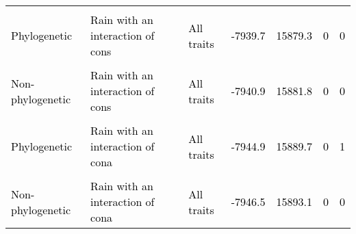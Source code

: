 \documentclass[
  12pt,
  letterpaper,
  DIV=11,
  numbers=noendperiod]{scrartcl}
\begin{document}
\begin{table}[H]
{\begin{tabular}[t]{lllllll}
\cellcolor{gray!6}{\textcolor{black}{Non-phylogenetic}} & \cellcolor{gray!6}{\textcolor{black}{No rain}} & \cellcolor{gray!6}{\textcolor{black}{All traits}} & \cellcolor{gray!6}{\textcolor{black}{-7939.2}} & \cellcolor{gray!6}{\textcolor{black}{15878.5}} & \cellcolor{gray!6}{\textcolor{black}{0}} & \cellcolor{gray!6}{\textcolor{black}{0}}\\
\addlinespace
\textcolor{black}{Phylogenetic} & \textcolor{black}{Rain with an interaction of cons} & \textcolor{black}{All traits} & \textcolor{black}{-7939.7} & \textcolor{black}{15879.3} & \textcolor{black}{0} & \textcolor{black}{0}\\
\cellcolor{gray!6}{\textcolor{black}{Non-phylogenetic}} & \cellcolor{gray!6}{\textcolor{black}{Rain without interactions}} & \cellcolor{gray!6}{\textcolor{black}{All traits}} & \cellcolor{gray!6}{\textcolor{black}{-7940.2}} & \cellcolor{gray!6}{\textcolor{black}{15880.3}} & \cellcolor{gray!6}{\textcolor{black}{0}} & \cellcolor{gray!6}{\textcolor{black}{0}}\\
\textcolor{black}{Non-phylogenetic} & \textcolor{black}{Rain with an interaction of cons} & \textcolor{black}{All traits} & \textcolor{black}{-7940.9} & \textcolor{black}{15881.8} & \textcolor{black}{0} & \textcolor{black}{0}\\
\cellcolor{gray!6}{\textcolor{black}{Phylogenetic}} & \cellcolor{gray!6}{\textcolor{black}{Rain with an interaction of cons and cona}} & \cellcolor{gray!6}{\textcolor{black}{All traits}} & \cellcolor{gray!6}{\textcolor{black}{-7944.7}} & \cellcolor{gray!6}{\textcolor{black}{15889.4}} & \cellcolor{gray!6}{\textcolor{black}{0}} & \cellcolor{gray!6}{\textcolor{black}{0}}\\
\textcolor{black}{Phylogenetic} & \textcolor{black}{Rain with an interaction of cona} & \textcolor{black}{All traits} & \textcolor{black}{-7944.9} & \textcolor{black}{15889.7} & \textcolor{black}{0} & \textcolor{black}{1}\\
\addlinespace
\cellcolor{gray!6}{\textcolor{black}{Non-phylogenetic}} & \cellcolor{gray!6}{\textcolor{black}{Rain with an interaction of cons and cona}} & \cellcolor{gray!6}{\textcolor{black}{All traits}} & \cellcolor{gray!6}{\textcolor{black}{-7945.8}} & \cellcolor{gray!6}{\textcolor{black}{15891.7}} & \cellcolor{gray!6}{\textcolor{black}{0}} & \cellcolor{gray!6}{\textcolor{black}{0}}\\
\textcolor{black}{Non-phylogenetic} & \textcolor{black}{Rain with an interaction of cona} & \textcolor{black}{All traits} & \textcolor{black}{-7946.5} & \textcolor{black}{15893.1} & \textcolor{black}{0} & \textcolor{black}{0}\\

\end{tabular}}
\end{table}
\end{document}
